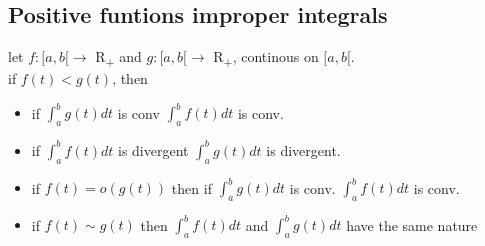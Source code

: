 \documentclass{article}
\begin{document}
\subsection{Positive funtions improper integrals}
let $f: [ a, b [ \rightarrow $ R\textsubscript{+} and $g: [ a, b [ \rightarrow $ R\textsubscript{+}, continous on $ [a, b [ $.\\
if $f(t) < g(t)$, then\\
\begin{itemize}
    \item if $\int _ { a } ^ { b } g ( t ) d t$ is conv \Rightarrow $\int _ { a } ^ { b } f ( t ) d t$ is conv.\\ 
    \item if $\int _ { a } ^ { b } f ( t ) d t$ is divergent \Rightarrow $\int _ { a } ^ { b } g ( t ) d t$ is divergent.\\
    \item if $f(t) =  o (g(t)) $ then if $\int _ { a } ^ { b } g ( t ) d t$ is conv. \Rightarrow $\int _ { a } ^ { b } f ( t ) d t$ is conv.\\
    \item if $f(t) \sim g(t) $ then $\int _ { a } ^ { b } f ( t ) d t$ and $\int _ { a } ^ { b } g ( t ) d t $ have the same nature\\ 
\end{itemize}
\end{document}
